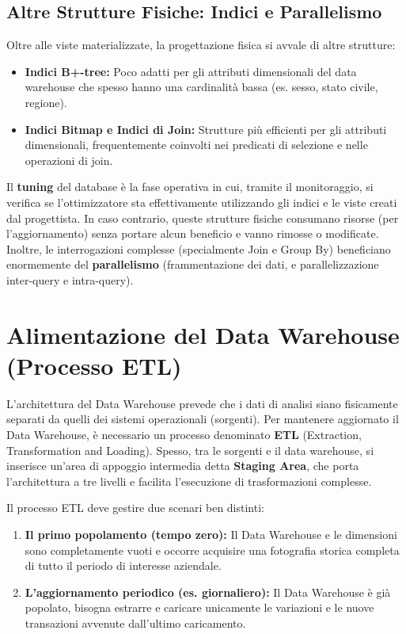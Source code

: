 \subsection{Altre Strutture Fisiche: Indici e Parallelismo}
Oltre alle viste materializzate, la progettazione fisica si avvale di altre strutture:
\begin{itemize}
    \item \textbf{Indici B+-tree:} Poco adatti per gli attributi dimensionali del data warehouse che spesso hanno una cardinalità bassa (es. sesso, stato civile, regione).
    \item \textbf{Indici Bitmap e Indici di Join:} Strutture più efficienti per gli attributi dimensionali, frequentemente coinvolti nei predicati di selezione e nelle operazioni di join.
\end{itemize}
Il \textbf{tuning} del database è la fase operativa in cui, tramite il monitoraggio, si verifica se l'ottimizzatore sta effettivamente utilizzando gli indici e le viste creati dal progettista. In caso contrario, queste strutture fisiche consumano risorse (per l'aggiornamento) senza portare alcun beneficio e vanno rimosse o modificate.
Inoltre, le interrogazioni complesse (specialmente Join e Group By) beneficiano enormemente del \textbf{parallelismo} (frammentazione dei dati, e parallelizzazione inter-query e intra-query).

\section{Alimentazione del Data Warehouse (Processo ETL)}
L'architettura del Data Warehouse prevede che i dati di analisi siano fisicamente separati da quelli dei sistemi operazionali (sorgenti). Per mantenere aggiornato il Data Warehouse, è necessario un processo denominato \textbf{ETL} (Extraction, Transformation and Loading).
Spesso, tra le sorgenti e il data warehouse, si inserisce un'area di appoggio intermedia detta \textbf{Staging Area}, che porta l'architettura a tre livelli e facilita l'esecuzione di trasformazioni complesse.

Il processo ETL deve gestire due scenari ben distinti:
\begin{enumerate}
    \item \textbf{Il primo popolamento (tempo zero):} Il Data Warehouse e le dimensioni sono completamente vuoti e occorre acquisire una fotografia storica completa di tutto il periodo di interesse aziendale.
    \item \textbf{L'aggiornamento periodico (es. giornaliero):} Il Data Warehouse è già popolato, bisogna estrarre e caricare unicamente le variazioni e le nuove transazioni avvenute dall'ultimo caricamento.
\end{enumerate}

